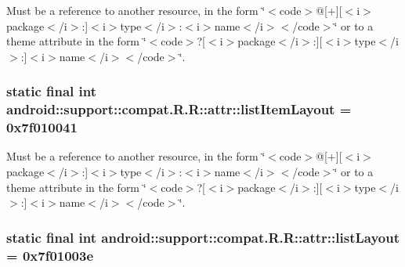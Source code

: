 Must be a reference to another resource, in the form \char`\"{}$<$code$>$@\mbox{[}+\mbox{]}\mbox{[}$<$i$>$package$<$/i$>$:\mbox{]}$<$i$>$type$<$/i$>$:$<$i$>$name$<$/i$>$$<$/code$>$\char`\"{} or to a theme attribute in the form \char`\"{}$<$code$>$?\mbox{[}$<$i$>$package$<$/i$>$:\mbox{]}\mbox{[}$<$i$>$type$<$/i$>$:\mbox{]}$<$i$>$name$<$/i$>$$<$/code$>$\char`\"{}. \hypertarget{classandroid_1_1support_1_1compat_1_1_r_1_1attr_8a23e01a752cb3f62f6e1758dcf230af}{
\subsubsection[{listItemLayout}]{\setlength{\rightskip}{0pt plus 5cm}static final int android::support::compat.R.R::attr::listItemLayout = 0x7f010041}}
\label{classandroid_1_1support_1_1compat_1_1_r_1_1attr_8a23e01a752cb3f62f6e1758dcf230af}


Must be a reference to another resource, in the form \char`\"{}$<$code$>$@\mbox{[}+\mbox{]}\mbox{[}$<$i$>$package$<$/i$>$:\mbox{]}$<$i$>$type$<$/i$>$:$<$i$>$name$<$/i$>$$<$/code$>$\char`\"{} or to a theme attribute in the form \char`\"{}$<$code$>$?\mbox{[}$<$i$>$package$<$/i$>$:\mbox{]}\mbox{[}$<$i$>$type$<$/i$>$:\mbox{]}$<$i$>$name$<$/i$>$$<$/code$>$\char`\"{}. \hypertarget{classandroid_1_1support_1_1compat_1_1_r_1_1attr_6e10f5b76cf2f736e5c8867e87de2d98}{
\subsubsection[{listLayout}]{\setlength{\rightskip}{0pt plus 5cm}static final int android::support::compat.R.R::attr::listLayout = 0x7f01003e}}
\label{classandroid_1_1support_1_1compat_1_1_r_1_1attr_6e10f5b76cf2f736e5c8867e87de2d98}


